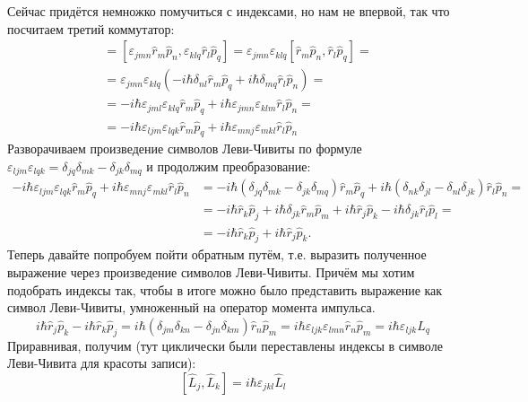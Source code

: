 Сейчас придётся немножко помучиться с индексами, но нам не впервой, так что посчитаем третий коммутатор:
\begin{align*}
    [\hat{L}_j, \hat{L}_k] &= [\varepsilon_{jmn} \hat{r}_m \hat{p}_n, \varepsilon_{klq} \hat{r}_l\hat{p}_q] = \varepsilon_{jmn}\varepsilon_{klq}[\hat{r}_m \hat{p}_n, \hat{r}_l\hat{p}_q] =\\
    &= \varepsilon_{jmn}\varepsilon_{klq}(-i\hbar\delta_{nl}\hat{r}_m\hat{p}_q + i\hbar\delta_{mq}\hat{r}_l\hat{p}_n) =\\
    &= -i\hbar \varepsilon_{jml}\varepsilon_{klq}\hat{r}_m\hat{p}_q + i\hbar\varepsilon_{jmn}\varepsilon_{klm}\hat{r}_l\hat{p}_n =\\ 
    &= -i\hbar\varepsilon_{ljm}\varepsilon_{lqk}\hat{r}_m\hat{p}_q + i\hbar\varepsilon_{mnj}\varepsilon_{mkl}\hat{r}_l\hat{p}_n
\end{align*}
Разворачиваем произведение символов Леви-Чивиты по формуле $\varepsilon_{ljm}\varepsilon_{lqk} = \delta_{jq}\delta_{mk} - \delta_{jk}\delta_{mq}$ и продолжим преобразование:
\begin{align*}
    -i\hbar\varepsilon_{ljm}\varepsilon_{lqk}\hat{r}_m\hat{p}_q + i\hbar\varepsilon_{mnj}\varepsilon_{mkl}\hat{r}_l\hat{p}_n &= 
    -i\hbar(\delta_{jq}\delta_{mk} - \delta_{jk}\delta_{mq})\hat{r}_m\hat{p}_q + i\hbar(\delta_{nk}\delta_{jl} - \delta_{nl}\delta_{jk})\hat{r}_l\hat{p}_n =\\
    &= -i\hbar\hat{r}_k\hat{p}_j + i\hbar\delta_{jk}\hat{r}_m\hat{p}_m + i\hbar\hat{r}_j\hat{p}_k - i\hbar\delta_{jk}\hat{r}_l\hat{p}_l =\\
    &= -i\hbar\hat{r}_k\hat{p}_j + i\hbar\hat{r}_j\hat{p}_k.
\end{align*}
Теперь давайте попробуем пойти обратным путём, т.е. выразить полученное выражение через произведение символов Леви-Чивиты. Причём мы хотим подобрать индексы так, чтобы в итоге можно было представить выражение как символ Леви-Чивиты, умноженный на оператор момента импульса.
\[
i\hbar\hat{r}_j\hat{p}_k - i\hbar\hat{r}_k\hat{p}_j = i\hbar(\delta_{jm}\delta_{kn} - \delta_{jn}\delta_{km})\hat{r}_n\hat{p}_m = i\hbar\varepsilon_{ljk}\varepsilon_{lmn}\hat{r}_n\hat{p}_m = i\hbar\varepsilon_{ljk}\hat{L}_q
\]
Приравнивая, получим (тут циклически были переставлены индексы в символе Леви-Чивита для красоты записи):
\[
[\hat{L}_j, \hat{L}_k] = i\hbar\varepsilon_{jkl}\hat{L}_l
\]


